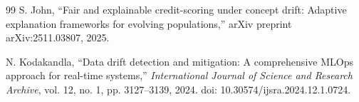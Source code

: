 \begin{thebibliography}{99}
S. John, ``Fair and explainable credit-scoring under concept drift: Adaptive explanation frameworks for evolving populations,'' arXiv preprint arXiv:2511.03807, 2025.

N. Kodakandla, ``Data drift detection and mitigation: A comprehensive MLOps approach for real-time systems,'' \textit{International Journal of Science and Research Archive}, vol. 12, no. 1, pp. 3127--3139, 2024. doi: 10.30574/ijsra.2024.12.1.0724.
\end{thebibliography}
